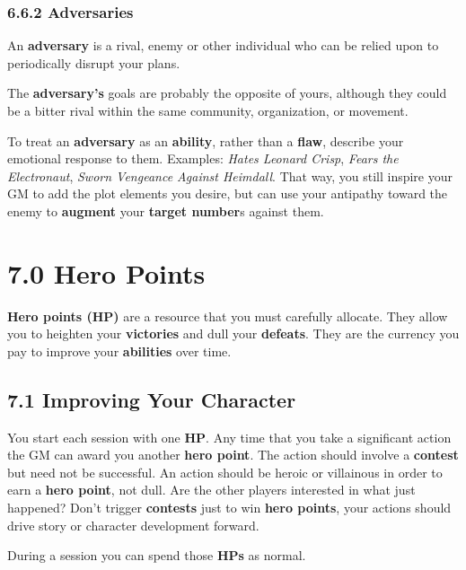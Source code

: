 \documentclass[
]{article}
\begin{document}
\hypertarget{adversaries}{%
\subsubsection{6.6.2 Adversaries}\label{adversaries}}

An \textbf{adversary} is a rival, enemy or other individual who can be
relied upon to periodically disrupt your plans.

The \textbf{adversary's} goals are probably the opposite of yours,
although they could be a bitter rival within the same community,
organization, or movement.

To treat an \textbf{adversary} as an \textbf{ability}, rather than a
\textbf{flaw}, describe your emotional response to them. Examples:
\emph{Hates Leonard Crisp}, \emph{Fears the Electronaut}, \emph{Sworn
Vengeance Against Heimdall}. That way, you still inspire your GM to add
the plot elements you desire, but can use your antipathy toward the
enemy to \textbf{augment} your \textbf{target number}s against them.

\hypertarget{hero-points}{%
\section{7.0 Hero Points}\label{hero-points}}

\textbf{Hero points (HP)} are a resource that you must carefully
allocate. They allow you to heighten your \textbf{victories} and dull
your \textbf{defeats}. They are the currency you pay to improve your
\textbf{abilities} over time.

\hypertarget{improving-your-character}{%
\subsection{7.1 Improving Your
Character}\label{improving-your-character}}

You start each session with one \textbf{HP}. Any time that you take a
significant action the GM can award you another \textbf{hero point}. The
action should involve a \textbf{contest} but need not be successful. An
action should be heroic or villainous in order to earn a \textbf{hero
point}, not dull. Are the other players interested in what just
happened? Don't trigger \textbf{contests} just to win \textbf{hero
points}, your actions should drive story or character development
forward.

During a session you can spend those \textbf{HPs} as normal.
\end{document}
